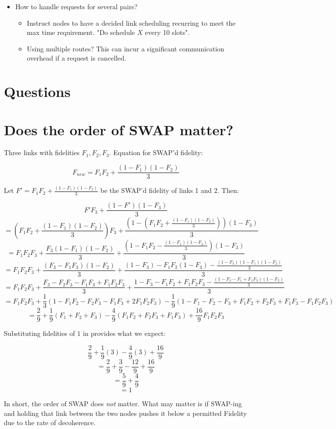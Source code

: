 \documentclass{article}
\begin{document}
\begin{itemize}
\begin{itemize}
    \end{itemize}
    \item How to handle requests for several pairs?
    \begin{itemize}
        \item Instruct nodes to have a decided link scheduling recurring to meet the max time requirement.  "Do schedule $X$ every 10 slots".
        \item Using multiple routes?  This can incur a significant communication overhead if a request is cancelled.
    \end{itemize}
\end{itemize}

\section{Questions}


\section{Does the order of SWAP matter?}
Three links with fidelities $F_1,F_2,F_3$. Equation for SWAP'd fidelity:

$$F_{new} = F_1F_2 + \frac{(1-F_1)(1-F_2)}{3}$$

Let $F' = F_1 F_2 + \frac{(1-F_1)(1-F_2)}{3}$ be the SWAP'd fidelity of links 1 and 2. Then:

    $$F' F_3 + \frac{(1-F')(1-F_3)}{3}$$
    $$=(F_1 F_2 + \frac{(1-F_1)(1-F_2)}{3})F_3 + \frac{(1-(F_1 F_2 + \frac{(1-F_1)(1-F_2)}{3}))(1-F_3)}{3}$$
    $$=F_1 F_2F_3 + \frac{F_3(1-F_1)(1-F_2)}{3} + \frac{(1-F_1 F_2 - \frac{(1-F_1)(1-F_2)}{3})(1-F_3)}{3}$$
    $$=F_1 F_2F_3 + \frac{(F_3-F_1F_3)(1-F_2)}{3} + \frac{(1-F_3)-F_1 F_2(1-F_3) - \frac{(1-F_3)(1-F_1)(1-F_2)}{3}}{3}$$
    $$=F_1 F_2F_3 + \frac{F_3 - F_2F_3 - F_1F_3 + F_1F_2F_3}{3} + \frac{1-F_3-F_1 F_2+F_1F_2F_3 - \frac{(1-F_3-F_1+F_1F_3)(1-F_2)}{3}}{3}$$
    $$=F_1 F_2F_3 + \frac{1}{3}(1 - F_1F_2 - F_2F_3 - F_1F_3 + 2F_1F_2F_3) - \frac{1}{9}(1 - F_1 - F_2 - F_3 + F_1F_2 + F_2F_3 + F_1F_3 - F_1F_2F_3)$$
    $$=\frac{2}{9} + \frac{1}{9}(F_1 + F_2 + F_3) - \frac{4}{9}(F_1F_2 + F_2F_3 + F_1F_3) + \frac{16}{9}F_1 F_2F_3$$

Substituting fidelities of $1$ in provides what we expect:

$$\frac{2}{9} + \frac{1}{9}(3) - \frac{4}{9}(3) + \frac{16}{9}$$
$$=\frac{2}{9} + \frac{3}{9} - \frac{12}{9} + \frac{16}{9}$$
$$=\frac{5}{9} + \frac{4}{9}$$
$$=1$$

In short, the order of SWAP does \emph{not} matter.  What may matter is if SWAP-ing and holding that link between the two nodes pushes it below a permitted Fidelity due to the rate of decoherence.
\end{document}
